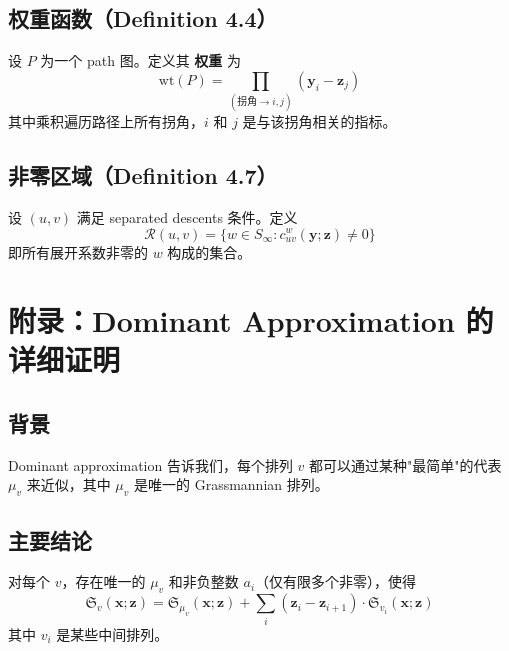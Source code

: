 \subsection*{权重函数（Definition 4.4）}
\begin{Definition}
\label{def:WeightFunction}
设 $P$ 为一个 path 图。定义其 \textbf{权重} 为
\begin{equation}
\mathrm{wt}(P) = \prod_{(\text{拐角} \to i,j)} (\mathbf{y}_i - \mathbf{z}_j)
\label{eq:PathWeight}
\end{equation}
其中乘积遍历路径上所有拐角，$i$ 和 $j$ 是与该拐角相关的指标。
\end{Definition}

\subsection*{非零区域（Definition 4.7）}
\begin{Definition}
\label{def:NonZeroRegion}
设 $(u, v)$ 满足 separated descents 条件。定义
\begin{equation}
\mathcal{R}(u, v) = \{ w \in S_\infty : c_{uv}^w(\mathbf{y}; \mathbf{z}) \neq 0 \}
\label{eq:NonZeroRegion}
\end{equation}
即所有展开系数非零的 $w$ 构成的集合。
\end{Definition}

\section{附录：Dominant Approximation 的详细证明}
\label{sec:appendix-ch2-dominant}

\subsection*{背景}
Dominant approximation 告诉我们，每个排列 $v$ 都可以通过某种"最简单"的代表 $\mu_v$ 来近似，其中 $\mu_v$ 是唯一的 Grassmannian 排列。

\subsection*{主要结论}
对每个 $v$，存在唯一的 $\mu_v$ 和非负整数 $a_i$（仅有限多个非零），使得
\begin{equation}
\mathfrak{S}_v(\mathbf{x}; \mathbf{z}) = \mathfrak{S}_{\mu_v}(\mathbf{x}; \mathbf{z}) + \sum_{i} (\mathbf{z}_i - \mathbf{z}_{i+1}) \cdot \mathfrak{S}_{v_i}(\mathbf{x}; \mathbf{z})
\label{eq:DominantApproxDetail}
\end{equation}
其中 $v_i$ 是某些中间排列。

